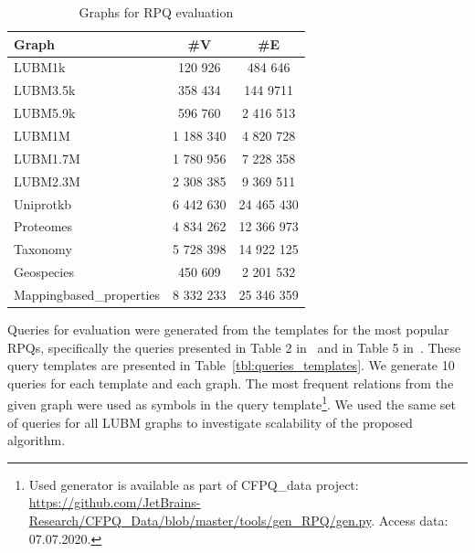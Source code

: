 \begin{table}
\caption{Graphs for RPQ evaluation}
\label{tbl:graphs_for_rpq}
{
\begin{tabular}{|l|c|c|}
\hline
Graph & \#V & \#E  \\
\hline
\hline
LUBM1k  & 120 926 & 484 646 \\
LUBM3.5k  & 358 434 & 144 9711 \\
LUBM5.9k  & 596 760 & 2 416 513 \\
LUBM1M   & 1 188 340 & 4 820 728 \\
LUBM1.7M & 1 780 956 & 7 228 358 \\
LUBM2.3M & 2 308 385 & 9 369 511 \\
\hline
Uniprotkb & 6 442 630 & 24 465 430 \\
Proteomes & 4 834 262 & 12 366 973 \\
Taxonomy & 5 728 398 & 14 922 125 \\
\hline
Geospecies & 450 609 & 2 201 532 \\
Mappingbased\_properties & 8 332 233 & 25 346 359 \\
\hline
\end{tabular}
}
\end{table}


Queries for evaluation were generated from the templates for the most popular RPQs, specifically the queries presented in Table 2 in~\cite{Pacaci2020RegularPQ} and in Table 5 in~\cite{Wang2019}.
These query templates are presented in Table~\ref{tbl:queries_templates}.
We generate 10 queries for each template and each graph.
The most frequent relations from the given graph were used as symbols in the query template\footnote{Used generator is available as part of CFPQ\_data project: \url{https://github.com/JetBrains-Research/CFPQ_Data/blob/master/tools/gen_RPQ/gen.py}. Access data: 07.07.2020.}.
We used the same set of queries for all LUBM graphs to investigate scalability of the proposed algorithm.

